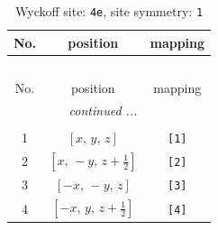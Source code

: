 \documentclass[fleqn,8pt]{jsarticle}
\begin{document}
\begin{longtable}{ccc}
\caption{Wyckoff site: {\tt 4e}, site symmetry: {\tt 1}}
 \\
 \hline \hline
No. & position & mapping \\ \hline \endfirsthead

\multicolumn{2}{l}{\tablename\ \thetable{}} \\
 \hline \hline
No. & position & mapping \\ \hline \endhead

 \hline \hline
\multicolumn{2}{r}{\footnotesize\it continued ...} \\ \endfoot

 \hline \hline
\multicolumn{2}{r}{} \\ \endlastfoot

1 & $\left[ x,\, y,\, z \right]$ & {\tt [1]} \\ \hline
2 & $\left[ x,\, - y,\, z + \frac{1}{2} \right]$ & {\tt [2]} \\ \hline
3 & $\left[ - x,\, - y,\, z \right]$ & {\tt [3]} \\ \hline
4 & $\left[ - x,\, y,\, z + \frac{1}{2} \right]$ & {\tt [4]} \\
\end{longtable}
\end{document}
